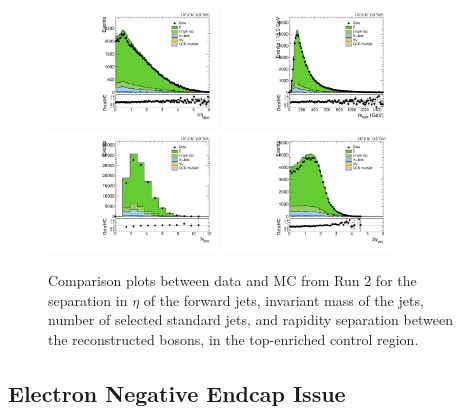\begin{figure}[htbp]
  \centering
  \includegraphics[width=0.4\textwidth]{fig/controlPlots/CR_b1_allL_allP_allC_allE_Run2_lnujj_vbfDEta.pdf}
  \includegraphics[width=0.4\textwidth]{fig/controlPlots/CR_b1_allL_allP_allC_allE_Run2_lnujj_vbfMass.pdf}\\
  \includegraphics[width=0.4\textwidth]{fig/controlPlots/CR_b1_allL_allP_allC_allE_Run2_lnujj_nJets.pdf}
  \includegraphics[width=0.4\textwidth]{fig/controlPlots/CR_b1_allL_allP_allC_allE_Run2_dy.pdf}\\
  \caption{
    Comparison plots between data and MC from Run 2 for the separation in $\eta$ of the \VBF forward jets, invariant mass of the \VBF jets, number of selected standard jets, and rapidity separation between the reconstructed bosons, in the top-enriched control region.
  }
  \label{fig:CR_controlPlotsRun2_4}
\end{figure}

\subsection{Electron Negative Endcap Issue}

